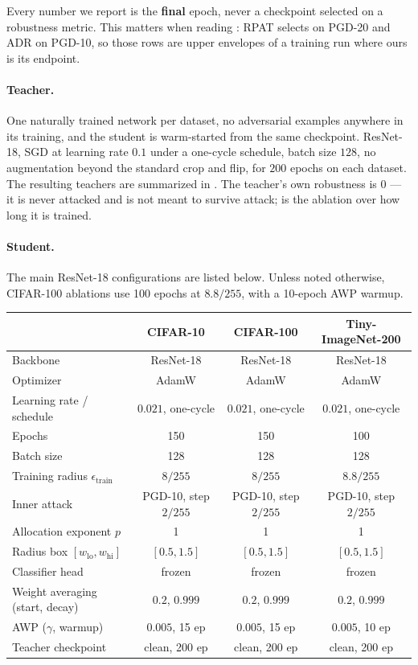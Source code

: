 Every number we report is the \textbf{final} epoch, never a checkpoint selected on a robustness
metric. This matters when reading : RPAT selects on PGD-20 and ADR on PGD-10, so
those rows are upper envelopes of a training run where ours is its endpoint.

\paragraph{Teacher.} One naturally trained network per dataset, no adversarial examples anywhere in
its training, and the student is warm-started from the same checkpoint. ResNet-18, SGD at learning
rate $0.1$ under a one-cycle schedule, batch size $128$, no augmentation beyond the standard crop and
flip, for $200$ epochs on each dataset. The resulting teachers are summarized in
. The
teacher's own robustness is $0$ --- it is never attacked and is not meant to survive attack;
 is the ablation over how long it is trained.

\paragraph{Student.} The main ResNet-18 configurations are listed below. Unless noted otherwise,
CIFAR-100 ablations use 100 epochs at $8.8/255$, with a 10-epoch AWP warmup.

\begin{center}\small
\begin{tabular}{lccc}
  \toprule
  & CIFAR-10 & CIFAR-100 & Tiny-ImageNet-200 \\
  \midrule
  Backbone                       & ResNet-18 & ResNet-18 & ResNet-18 \\
  Optimizer                      & AdamW & AdamW & AdamW \\
  Learning rate / schedule       & $0.021$, one-cycle & $0.021$, one-cycle & $0.021$, one-cycle \\
  Epochs                         & 150 & 150 & 100 \\
  Batch size                     & 128 & 128 & 128 \\
  Training radius $\epsilon_{\mathrm{train}}$ & $8/255$ & $8/255$ & $8.8/255$ \\
  Inner attack                   & PGD-10, step $2/255$ & PGD-10, step $2/255$ & PGD-10, step $2/255$ \\
  Allocation exponent $p$        & 1 & 1 & 1 \\
  Radius box $[w_{\mathrm{lo}},w_{\mathrm{hi}}]$ & $[0.5,1.5]$ & $[0.5,1.5]$ & $[0.5,1.5]$ \\
  Classifier head                & frozen & frozen & frozen \\
  Weight averaging (start, decay)& $0.2$, $0.999$ & $0.2$, $0.999$ & $0.2$, $0.999$ \\
  AWP ($\gamma$, warmup)         & $0.005$, 15 ep & $0.005$, 15 ep & $0.005$, 10 ep \\
  Teacher checkpoint             & clean, 200 ep & clean, 200 ep & clean, 200 ep \\
  \bottomrule
\end{tabular}
\end{center}

